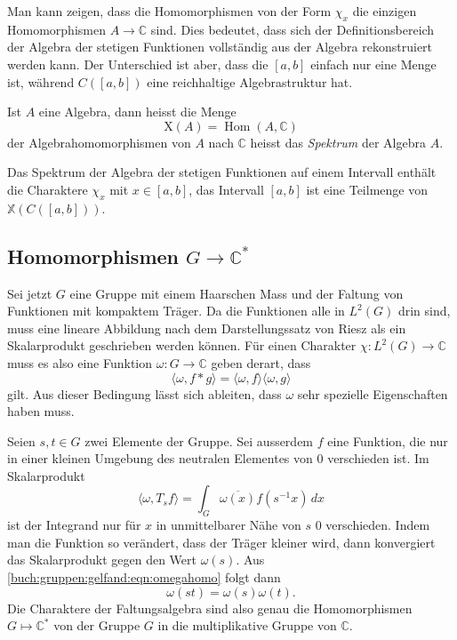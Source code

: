 Man kann zeigen, dass die Homomorphismen von der Form $\chi_x$ 
die einzigen Homomorphismen $A\to\mathbb{C}$ sind.
Dies bedeutet, dass sich der Definitionsbereich der Algebra der
stetigen Funktionen vollständig aus der Algebra rekonstruiert werden 
kann.
Der Unterschied ist aber, dass die $[a,b]$ einfach nur eine Menge ist,
während $C([a,b])$ eine reichhaltige Algebrastruktur hat.

\begin{definition}
\label{buch:gruppen:gelfand:def:spektrum}
Ist $A$ eine Algebra, dann heisst die Menge
\[
\mathrm{X}(A)
=
\operatorname{Hom}(A,\mathbb{C})
\]
der Algebrahomomorphismen von $A$ nach $\mathbb{C}$ heisst das
{\em Spektrum} der Algebra $A$.
\end{definition}

Das Spektrum der Algebra der stetigen Funktionen auf einem Intervall
enthält die Charaktere $\chi_x$ mit $x\in [a,b]$, das Intervall
$[a,b]$ ist eine Teilmenge von $\mathbb{X}(C([a,b]))$.

%
%
\subsection{Homomorphismen $G\to \mathbb{C}^*$}
Sei jetzt $G$ eine Gruppe mit einem Haarschen Mass und der Faltung 
von Funktionen mit kompaktem Träger.
Da die Funktionen alle in $L^2(G)$ drin sind, muss eine lineare
Abbildung nach dem Darstellungssatz von Riesz als ein Skalarprodukt
geschrieben werden können.
Für einen Charakter $\chi\colon L^2(G)\to\mathbb{C}$ muss es also eine
Funktion $\omega\colon G\to\mathbb{C}$ geben derart, dass
\begin{equation}
\langle \omega, f*g\rangle
=
\langle \omega, f\rangle
\langle \omega, g\rangle
\label{buch:gruppen:gelfand:eqn:omegahomo}
\end{equation}
gilt.
Aus dieser Bedingung lässt sich ableiten, dass $\omega$ sehr spezielle
Eigenschaften haben muss.

Seien $s,t\in G$ zwei Elemente der Gruppe.
Sei ausserdem $f$ eine Funktion, die nur in einer kleinen Umgebung 
des neutralen Elementes von $0$ verschieden ist.
Im Skalarprodukt
\[
\langle \omega, T_{s}f\rangle
=
\int_{G} \overline{\omega(x)} f(s^{-1}x) \,dx
\]
ist der Integrand nur für $x$ in unmittelbarer Nähe von $s$ 
$0$ verschieden.
Indem man die Funktion so verändert, dass der Träger kleiner wird,
dann konvergiert das Skalarprodukt gegen den Wert $\omega(s)$.
Aus \eqref{buch:gruppen:gelfand:eqn:omegahomo} folgt dann
\[
\omega(st) = \omega(s)\omega(t).
\]
Die Charaktere der Faltungsalgebra sind also genau die Homomorphismen
$G\mapsto\mathbb{C}^*$ von der Gruppe $G$ in die multiplikative
Gruppe von $\mathbb{C}$.


